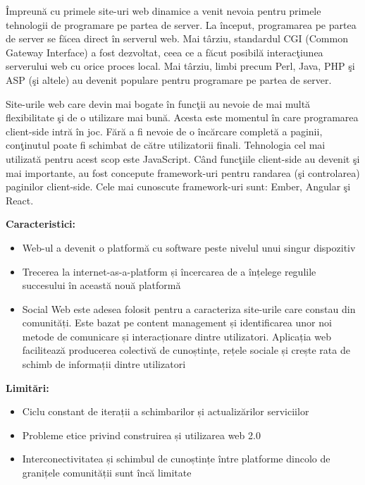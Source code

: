 \documentclass[12pt, a4paper]{report}
\begin{document}
\^ Impreun\u a cu primele site-uri web dinamice a venit nevoia pentru primele tehnologii de programare pe partea de server. La \^ inceput, programarea pe partea de server se f\u acea direct \^ in serverul web. Mai t\^ arziu, standardul CGI (Common Gateway Interface) a fost dezvoltat, ceea ce a f\u acut posibil\u a interac\c tiunea serverului web cu orice proces local.
Mai t\^ arziu, limbi precum Perl, Java, PHP \c si ASP (\c si altele) au devenit populare pentru programare pe partea de server.

Site-urile web care devin mai bogate \^ in func\c tii au nevoie de mai mult\u a flexibilitate \c si de o utilizare mai bun\u a. Acesta este momentul \^ in care programarea client-side intr\u a \^ in joc. F\u ar\u a a fi nevoie de o \^ inc\u arcare complet\u a a paginii, con\c tinutul poate fi schimbat de c\u atre utilizatorii finali. Tehnologia cel mai utilizat\u a pentru acest scop este JavaScript.
C\^ and func\c tiile client-side au devenit \c si mai importante, au fost concepute framework-uri pentru randarea (\c si controlarea) paginilor client-side. Cele mai cunoscute framework-uri sunt: Ember, Angular \c si React.

\textbf{Caracteristici:}
\begin{itemize}
	\item Web-ul a devenit o platformă cu software peste nivelul unui singur dispozitiv
	\item Trecerea la internet-as-a-platform și încercarea de a înțelege regulile succesului în această nouă platformă
	\item Social Web este adesea folosit pentru a caracteriza site-urile care constau din comunități. Este bazat pe content management și identificarea unor noi metode de comunicare și interacționare dintre utilizatori. Aplicația web facilitează producerea colectivă de cunoștințe, rețele sociale și crește rata de schimb de informații dintre utilizatori
\end{itemize}


\textbf{Limitări:}
\begin{itemize}
	\item Ciclu constant de iterații a schimbarilor și actualizărilor serviciilor
	\item Probleme etice privind construirea și utilizarea web 2.0
	\item Interconectivitatea și schimbul de cunoștințe între platforme dincolo de granițele comunității sunt încă limitate
\end{itemize}
\end{document}
